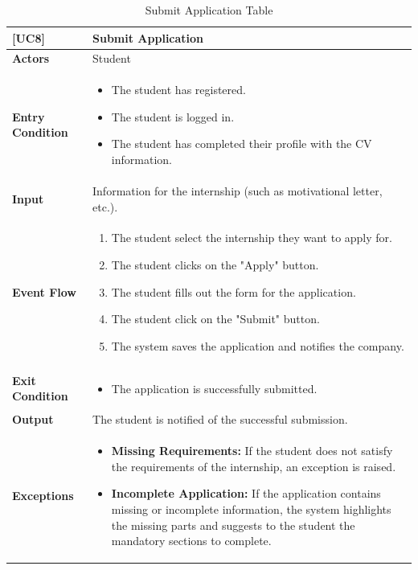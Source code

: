 \begin{table}[H]
    \centering
    \renewcommand{\arraystretch}{1.5}
    \begin{tabular}{|p{4cm}|p{11cm}|}
    \hline
    \rowcolor{bluepoli!40}
    \textbf{[UC8]} & \textbf{Submit Application} \\ \hline \hline
    \textbf{Actors} & Student \\ \hline
    \textbf{Entry Condition} & 
    {\setlength{\leftmargini}{1.1em}
    \begin{itemize}
        \item The student has registered.
        \item The student is logged in.
        \item The student has completed their profile with the CV information.
    \end{itemize}} \\ \hline
    \textbf{Input} & Information for the internship (such as motivational letter, etc.). \\ \hline
    \textbf{Event Flow} & 
    {\setlength{\leftmargini}{1.4em}
    \begin{enumerate}
        \item The student select the internship they want to apply for.
        \item The student clicks on the "Apply" button.
        \item The student fills out the form for the application.
        \item The student click on the "Submit" button.
        \item The system saves the application and notifies the company.
    \end{enumerate}} \\ \hline
    \textbf{Exit Condition} & 
    {\setlength{\leftmargini}{1.1em}
    \begin{itemize}
        \item The application is successfully submitted.
    \end{itemize}} \\ \hline
    \textbf{Output} & 
    The student is notified of the successful submission. \\ \hline
    \textbf{Exceptions} & 
    {\setlength{\leftmargini}{1.1em}
    \begin{itemize}
        \item \textbf{Missing Requirements:} If the student does not satisfy the requirements of the internship, an exception is raised.
        \item \textbf{Incomplete Application:} If the application contains missing or incomplete information, the system highlights the missing parts and suggests to the student the mandatory sections to complete.
    \end{itemize}} \\ \hline
    \end{tabular}
    \caption{Submit Application Table}
\end{table}

